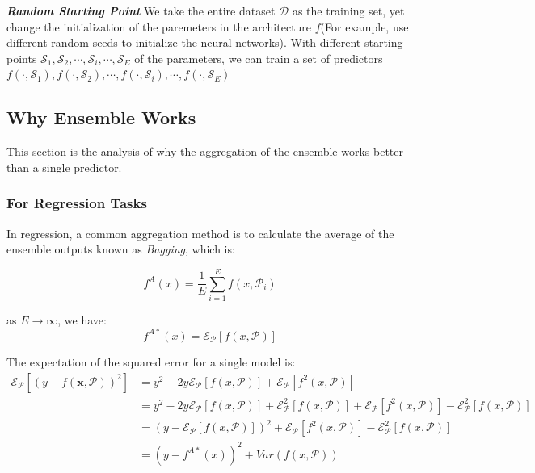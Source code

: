 \documentclass{article}
\begin{document}
\textit{\textbf{Random Starting Point}} We take the entire dataset $\mathcal{D}$ as the training set, yet change the initialization of the paremeters in the architecture $f$(For example, use different random seeds to initialize the neural networks). With different starting points $\mathcal{S}_1,\mathcal{S}_2,\cdots,\mathcal{S}_i,\cdots,\mathcal{S}_E$ of the parameters, we can train a set of predictors $f \left(\cdot , \mathcal{S}_1\right), f \left(\cdot , \mathcal{S}_2\right),\cdots, f \left(\cdot , \mathcal{S}_i\right),\cdots,f \left(\cdot , \mathcal{S}_E\right) $



\subsection{Why Ensemble Works}
This section is the analysis of why the aggregation of the ensemble works better than a single predictor.
\subsubsection{For Regression Tasks}
In regression, a common aggregation method is to calculate the average of the ensemble outputs known as \textit{Bagging}, which is:

\begin{equation}
    f^A\left(x\right) = \frac{1}{E}\sum_{i=1}^{E} f\left(x,\mathcal{P}_i\right)
\end{equation}

as $E\rightarrow\infty$, we have:
\begin{equation}
    f^{A*}\left(x\right) = \mathcal{E}_\mathcal{P}\left[f\left(x,\mathcal{P}\right)\right]
\end{equation}

The expectation of the squared error for a single model is:
\begin{equation}
\begin{split}
    \mathcal{E}_\mathcal{P}\left[{\left(y-f \left(\textbf{x} , \mathcal{P}\right)\right)}^2\right] &= y^2 - 2y\mathcal{E}_\mathcal{P}\left[f\left(x,\mathcal{P}\right)\right] + \mathcal{E}_\mathcal{P}\left[f^2\left(x,\mathcal{P}\right)\right] \\
    &= y^2 - 2y\mathcal{E}_\mathcal{P}\left[f\left(x,\mathcal{P}\right)\right] + \mathcal{E}^2_\mathcal{P}\left[f\left(x,\mathcal{P}\right)\right]+\mathcal{E}_\mathcal{P}\left[f^2\left(x,\mathcal{P}\right)\right]-\mathcal{E}^2_\mathcal{P}\left[f\left(x,\mathcal{P}\right)\right] \\
    &= {\left(y-\mathcal{E}_\mathcal{P}\left[f\left(x,\mathcal{P}\right)\right]\right)}^2+\mathcal{E}_\mathcal{P}\left[f^2\left(x,\mathcal{P}\right)\right]-\mathcal{E}^2_\mathcal{P}\left[f\left(x,\mathcal{P}\right)\right] \\
    &= {\left(y-f^{A*}\left(x\right)\right)}^2 + Var\left(f\left(x,\mathcal{P}\right)\right)
\end{split}
\label{equ1}
\end{equation}
\end{document}
